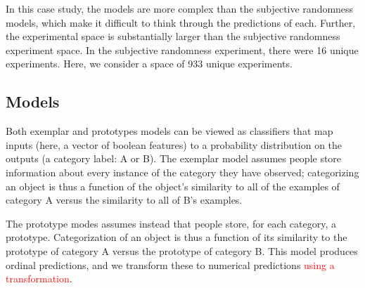 \documentclass{article}
\newcommand{\red}[1]{\textcolor{Red}{#1}}
\newcommand{\lou}[1]{\textcolor{orange}{[lou: #1]}}
\begin{document}
In this case study, the models are more complex than the subjective randomness models, which make it difficult to think through the predictions of each.
Further, the experimental space is substantially larger than the subjective randomness experiment space. In the subjective randomness experiment, there were 16 unique experiments. Here, we consider a space of 933 unique experiments.


%
%
%
%




\subsection{Models}

Both exemplar and prototypes models can be viewed as classifiers that map inputs (here, a vector of boolean features) to a probability distribution on the outputs (a category label: A or B).
The exemplar model assumes people store information about every instance of the category they have observed; categorizing an object is thus a function of the object's similarity to all of the examples of category A versus the similarity to all of B's examples.

The prototype modes assumes instead that people store, for each category, a prototype. Categorization of an object is thus a function of its similarity to the prototype of category A versus the prototype of category B.
This model produces ordinal predictions, and we transform these to numerical predictions \red{using a transformation}.
\end{document}
